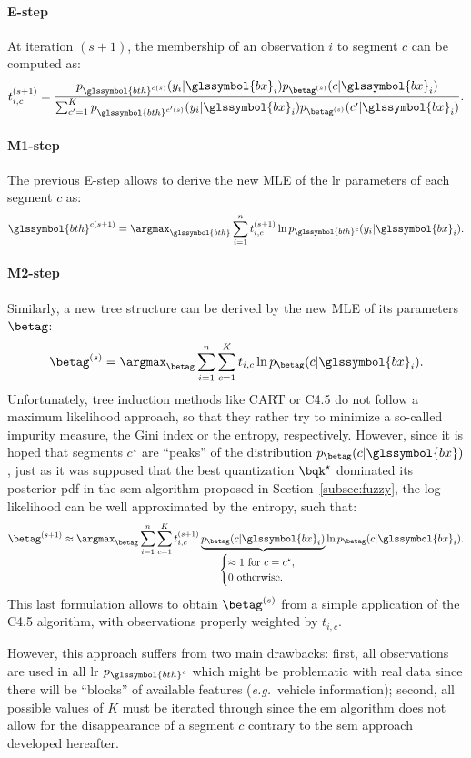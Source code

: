 \paragraph{E-step}
At iteration $(s+1)$, the membership of an observation $i$ to segment $c$ can be computed as:
\[ t_{i,c}^{(s+1)} = \frac{p_{\glssymbol{bth}^{c(s)}}(y_i | \glssymbol{bx}_i) p_{\betag^{(s)}}(c | \glssymbol{bx}_i) }{ \sum_{c'=1}^K p_{\glssymbol{bth}^{c{'}{(s)}}}(y_i | \glssymbol{bx}_i) p_{\betag^{(s)}}(c{'} | \glssymbol{bx}_i) }.\]

\paragraph{M1-step}
The previous E-step allows to derive the new MLE of the \gls{lr} parameters of each segment $c$ as:
\[ \glssymbol{bth}^{c(s+1)} = \argmax_{\glssymbol{bth}} \sum_{i=1}^n t_{i,c}^{(s+1)} \ln p_{\glssymbol{bth}^c}(y_i | \glssymbol{bx}_i). \]

\paragraph{M2-step}
Similarly, a new tree structure can be derived by the new MLE of its parameters $\betag$:
\[ \betag^{(s)} = \argmax_{\betag} \sum_{i=1}^n \sum_{c=1}^K t_{i,c} \ln p_{\betag}( c | \glssymbol{bx}_i). \]
Unfortunately, tree induction methods like CART or C4.5 do not follow a maximum likelihood approach, so that they rather try to minimize a so-called impurity measure, the Gini index or the entropy, respectively. However, since it is hoped that segments $c^\star$ are ``peaks'' of the distribution $p_{\betag}( c | \glssymbol{bx})$, just as it was supposed that the best quantization $\bqk^\star$ dominated its posterior \gls{pdf} in the \gls{sem} algorithm proposed in Section~\ref{subsec:fuzzy}, the log-likelihood can be well approximated by the entropy, such that:
\[ \betag^{(s+1)} \approx \argmax_{\betag} \sum_{i=1}^n \sum_{c=1}^K t_{i,c}^{(s+1)} \underbrace{p_{\betag}( c | \glssymbol{bx}_i)}_{\begin{cases} \approx 1 \text{ for } c = c^\star, \\ 0 \text{ otherwise.} \end{cases}} \ln p_{\betag}( c | \glssymbol{bx}_i). \]
This last formulation allows to obtain $\betag^{(s)}$ from a simple application of the C4.5 algorithm, with observations properly weighted by $t_{i,c}$.

However, this approach suffers from two main drawbacks: first, all observations are used in all \gls{lr} $p_{\glssymbol{bth}^c}$ which might be problematic with real data since there will be ``blocks'' of available features (\textit{e.g.}\ vehicle information); second, all possible values of $K$ must be iterated through since the \gls{em} algorithm does not allow for the disappearance of a segment $c$ contrary to the \gls{sem} approach developed hereafter.

